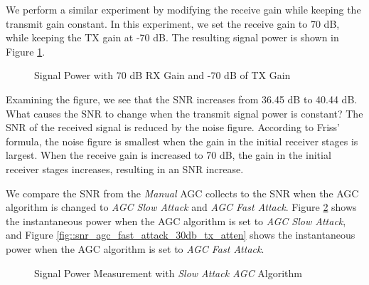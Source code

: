 \documentclass{article}
\begin{document}
We perform a similar experiment by modifying the receive gain while keeping the transmit gain constant. In this experiment, we set the receive gain to 70 dB, while keeping the TX gain at -70 dB. The resulting signal power is shown in Figure \ref{fig::snr_manual_agc_70db_rx_gain_70db_tx_atten}.

\begin{figure}[H]
	\centerline{}
	\caption{Signal Power with 70 dB RX Gain and -70 dB of TX Gain}
	\label{fig::snr_manual_agc_70db_rx_gain_70db_tx_atten}
\end{figure}

Examining the figure, we see that the SNR increases from 36.45 dB to 40.44 dB. What causes the SNR to change when the transmit signal power is constant? The SNR of the received signal is reduced by the noise figure. According to Friss' formula, the noise figure is smallest when the gain in the initial receiver stages is largest. When the receive gain is increased to 70 dB, the gain in the initial receiver stages increases, resulting in an SNR increase.

We compare the SNR from the \textit{Manual} AGC collects to the SNR when the AGC algorithm is changed to \textit{AGC Slow Attack} and \textit{AGC Fast Attack}. Figure \ref{fig::snr_agc_slow_attack_30db_tx_atten} shows the instantaneous power when the AGC algorithm is set to \textit{AGC Slow Attack}, and Figure \ref{fig::snr_agc_fast_attack_30db_tx_atten} shows the instantaneous power when the AGC algorithm is set to \textit{AGC Fast Attack}.

\begin{figure}[H]
	\centerline{}
	\caption{Signal Power Measurement with \textit{Slow Attack AGC} Algorithm}
	\label{fig::snr_agc_slow_attack_30db_tx_atten}
\end{figure}
\end{document}
